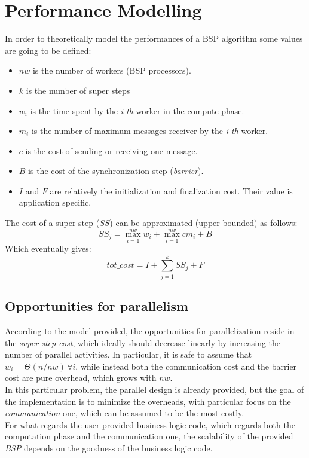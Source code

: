 \documentclass[]{article}
\begin{document}
\section{Performance Modelling}
\label{sec:perfModel}

In order to theoretically model the performances of a BSP algorithm some values are going to be defined:
\begin{itemize}
	\item $\mathit{nw}$ is the number of workers (BSP processors).
	\item $k$ is the number of super steps
	\item $w_i$ is the time spent by the \emph{i-th} worker in the compute phase.
	\item $m_i$ is the number of maximum messages receiver by the \emph{i-th} worker.
	\item $c$ is the cost of sending or receiving one message.
	\item $B$ is the cost of the synchronization step (\emph{barrier}).
	\item $I$ and $F$ are relatively the initialization and finalization cost. Their value is application specific.
\end{itemize}
The cost of a super step ($\mathit{SS}$) can be approximated (upper bounded) as follows:
$$ \mathit{SS}_j = \max_{i=1}^{\mathit{nw}} w_i + \max_{i=1}^{\mathit{nw}} c m_i + B $$
Which eventually gives:
$$ \mathit{tot\_cost} = I + \sum_{j=1}^{k} \mathit{SS}_j + F $$
\subsection{Opportunities for parallelism}
According to the model provided, the opportunities for parallelization reside in the \emph{super step cost}, which ideally should decrease linearly by increasing the number of parallel activities. In particular, it is safe to assume that $w_i = \Theta(n/\mathit{nw}) \, \forall i$, while instead both the communication cost and the barrier cost are pure overhead, which grows with $\mathit{nw}$. \\
In this particular problem, the parallel design is already provided, but the goal of the implementation is to minimize the overheads, with particular focus on the \emph{communication} one, which can be assumed to be the most costly. \\

For what regards the user provided business logic code, which regards both the computation phase and the communication one, the scalability of the provided \emph{BSP} depends on the goodness of the business logic code.
\end{document}
